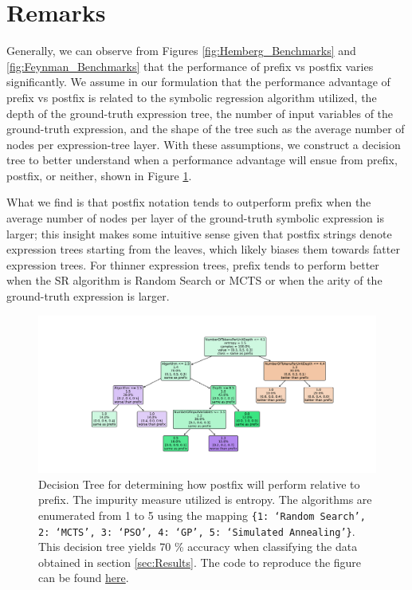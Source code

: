 \documentclass[runningheads]{llncs}
\begin{document}
\section{Remarks}
Generally, we can observe from Figures \ref{fig:Hemberg_Benchmarks} and \ref{fig:Feynman_Benchmarks} that the performance of prefix vs postfix varies significantly. We assume in our formulation that the performance advantage of prefix vs postfix is related to the symbolic regression algorithm utilized, the depth of the ground-truth expression tree, the number of input variables of the ground-truth expression, and the shape of the tree such as the average number of nodes per expression-tree layer. With these assumptions, we construct a decision tree to better understand when a performance advantage will ensue from prefix, postfix, or neither, shown in Figure \ref{fig:PrefixPostfixDecisionTree}. 
\par What we find is that postfix notation tends to outperform prefix when the average number of nodes per layer of the ground-truth symbolic expression is larger; this insight makes some intuitive sense given that postfix strings denote expression trees starting from the leaves, which likely biases them towards fatter expression trees. For thinner expression trees, prefix tends to perform better when the SR algorithm is Random Search or MCTS or when the arity of the ground-truth expression is larger. 

\begin{figure}
    \centering
    \includegraphics[width=\linewidth]{PrefixPostfixDecisionTree.pdf}
    \caption{Decision Tree for determining how postfix will perform relative to prefix. The impurity measure utilized is entropy. The algorithms are enumerated from 1 to 5 using the mapping \texttt{\{1: `Random Search', 2: `MCTS', 3: `PSO', 4: `GP', 5: `Simulated Annealing'\}}. This decision tree yields 70 \% accuracy when classifying the data obtained in section \ref{sec:Results}. The code to reproduce the figure can be found \href{https://github.com/edfink234/Alpha-Zero-Symbolic-Regression/blob/0b5b6d0b56c2d108dda023a337edeb1084436da7/PrefixPostfixDecisionTree.py}{here}. } 
    \label{fig:PrefixPostfixDecisionTree}
\end{figure}
\end{document}
